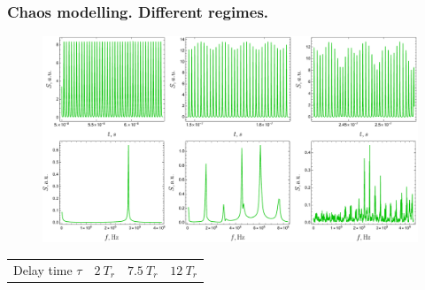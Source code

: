 \begin{frame}
	\frametitle{Chaos modelling. Different regimes.}
	
	\begin{figure}
		\centering
		\includegraphics[width=\linewidth]{figures/chaos_and_spectra.pdf}
	\end{figure}
	
	\begin{center}
		\begin{tabular}{c|c|c|c}
			Delay time $\tau$ & $2 \ T_r$ & $7.5 \ T_r$ & $12 \ T_r$
		\end{tabular}
	\end{center}

	
	
\end{frame}	

